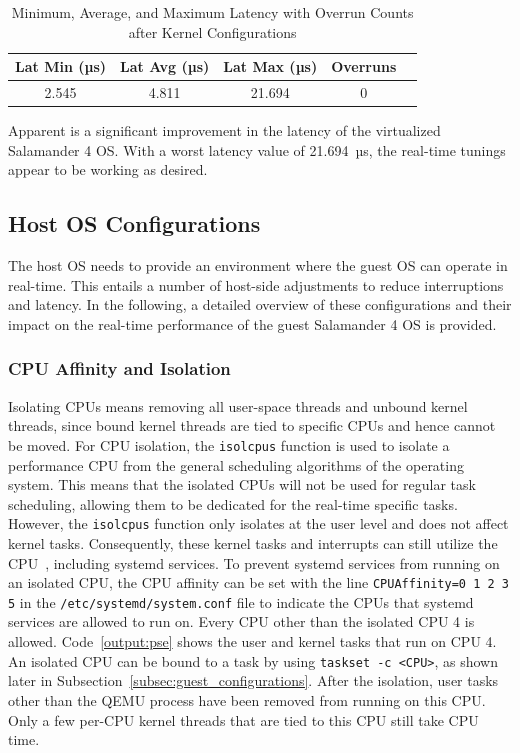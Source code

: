 \documentclass[MMR,Master,english]{style/twbook}
\begin{document}
\begin{table}[H]
	\centering
	\caption[Latency Statistics with Overrun Counts after Kernel Configurations]{Minimum, Average, and Maximum Latency with Overrun Counts after Kernel Configurations}
	\label{tab:latency_overrun_msw_new_virt_kernel}
	\begin{tabular}{|c|c|c|c|c|}
		\hline
		\textbf{Lat Min (µs)} & \textbf{Lat Avg (µs)} & \textbf{Lat Max (µs)} & \textbf{Overruns} \\ \hline
		2.545                 & 4.811                 & 21.694                & 0                 \\ \hline
	\end{tabular}
\end{table}

\noindent Apparent is a significant improvement in the latency of the virtualized Salamander 4 OS. With a worst latency value of 21.694~µs, the real-time tunings appear to be working as desired.

\clearpage

\subsection{Host OS Configurations}\label{subsec:host_configurations}
The host OS needs to provide an environment where the guest OS can operate in real-time. This entails a number of host-side adjustments to reduce interruptions and latency. In the following, a detailed overview of these configurations and their impact on the real-time performance of the guest Salamander 4 OS is provided.

\subsubsection{CPU Affinity and Isolation}\label{subsubsec:cpu_isolation}
Isolating CPUs means removing all user-space threads and unbound kernel threads, since bound kernel threads are tied to specific CPUs and hence cannot be moved. For CPU isolation, the \texttt{isolcpus} function is used to isolate a performance CPU from the general scheduling algorithms of the operating system. This means that the isolated CPUs will not be used for regular task scheduling, allowing them to be dedicated for the real-time specific tasks. However, the \texttt{isolcpus} function only isolates at the user level and does not affect kernel tasks. Consequently, these kernel tasks and interrupts can still utilize the CPU~\cite{maPerformanceTuningKVMbased2013}, including systemd services. To prevent systemd services from running on an isolated CPU, the CPU affinity can be set with the line \texttt{CPUAffinity=0 1 2 3 5} in the \texttt{/etc/systemd/system.conf} file to indicate the CPUs that systemd services are allowed to run on. Every CPU other than the isolated CPU 4 is allowed. Code~\ref{output:pse} shows the user and kernel tasks that run on CPU 4. An isolated CPU can be bound to a task by using \texttt{taskset -c <CPU>}, as shown later in Subsection~\ref{subsec:guest_configurations}. After the isolation, user tasks other than the QEMU process have been removed from running on this CPU. Only a few per-CPU kernel threads that are tied to this CPU still take CPU time.
\end{document}
